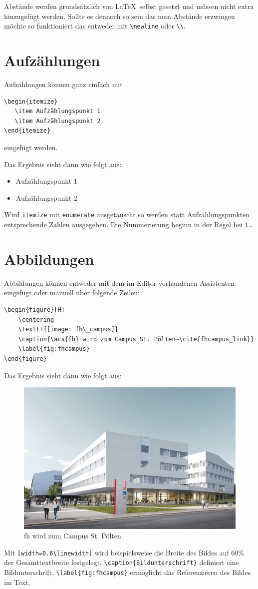 Abstände werden grundsätzlich von \LaTeX~selbst gesetzt und müssen nicht extra hinzugefügt werden. Sollte es dennoch so sein das man Abstände erzwingen möchte so funktioniert das entweder mit \verb|\newline| oder \verb|\\|.

\section{Aufzählungen}
Aufzählungen können ganz einfach mit
\begin{verbatim}
\begin{itemize}
   \item Aufzählungspunkt 1
   \item Aufzählungspunkt 2
\end{itemize}
\end{verbatim}
eingefügt werden.\pagebreak

Das Ergebnis sieht dann wie folgt aus:
\begin{itemize}
	\item Aufzählungspunkt 1
	\item Aufzählungspunkt 2
\end{itemize}
Wird \verb|itemize| mit \verb|enumerate| ausgetauscht so werden statt Aufzählungspunkten entsprechende Zahlen ausgegeben. Die Nummerierung beginn in der Regel bei \verb|1.|.

\section{Abbildungen}
Abbildungen können entweder mit dem im Editor vorhandenen Assistenten eingefügt oder manuell über folgende Zeilen:

\begin{verbatim}
\begin{figure}[H]
	\centering
	\texttt{[image: fh\_campus]}
	\caption{\acs{fh} wird zum Campus St. Pölten~\cite{fhcampus_link}}
	\label{fig:fhcampus}
\end{figure}
\end{verbatim}

Das Ergebnis sieht dann wie folgt aus:
\begin{figure}[H]
	\centering
	\includegraphics[width=0.6\linewidth]{Figures/fh_campus}
	\caption{\acs{fh} wird zum Campus St. Pölten~\cite{fhcampus_link}}
	\label{fig:fhcampus}
\end{figure}
Mit \verb|[width=0.6\linewidth]| wird beispielsweise die Breite des Bildes auf 60\% der Gesamttextbreite festgelegt. \verb|\caption{Bildunterschrift}| definiert eine Bildunterschrift, \verb|\label{fig:fhcampus}| ermöglicht das Referenzieren des Bildes im Text.

